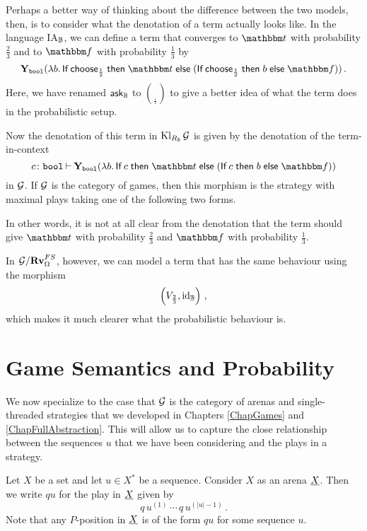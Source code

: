 Perhaps a better way of thinking about the difference between the two models, then, is to consider what the denotation of a term actually looks like.  
In the language IA${}_{\mathbb{B}}$, we can define a term that converges to $\true$ with probability $\frac23$ and to $\false$ with probability $\frac13$ by
\[
  \Y_\bool(\lambda b.\If \choose_{\frac12} \Then \true \Else (\If \choose_{\frac12} \Then b \Else \false))\,.
  \]
Here, we have renamed $\operatorname{{\mathsf{ask}}}_{\mathbb{B}}$ to $\choose_{\frac12}$ to give a better idea of what the term does in the probabilistic setup.

Now the denotation of this term in $\operatorname{Kl}_{R_{\mathbb{B}}}\mathcal G$ is given by the denotation of the term-in-context
\[
  c\from\bool\ts\Y_{\bool}(\lambda b.\If c \Then \true \Else (\If c \Then b \Else \false))
  \]
in $\mathcal G$.
If $\mathcal G$ is the category of games, then this morphism is the strategy with maximal plays taking one of the following two forms.
In other words, it is not at all clear from the denotation that the term should give $\true$ with probability $\frac23$ and $\false$ with probability $\frac13$.

In $\mathcal G/{\normalfont\textbf{Rv}}_{\Omega}^{FS}$, however, we can model a term that has the same behaviour using the morphism
\[
  \left(V_{\frac23}, \operatorname{id}_{\mathbb{B}}\right)\,,
  \]
which makes it much clearer what the probabilistic behaviour is.

\section{Game Semantics and Probability}

We now specialize to the case that $\mathcal G$ is the category of arenas and single-threaded strategies that we developed in Chapters \ref{ChapGames} and \ref{ChapFullAbstraction}.
This will allow us to capture the close relationship between the sequences $u$ that we have been considering and the plays in a strategy.

\begin{definition}
  Let $X$ be a set and let $u\in X^*$ be a sequence.  
  Consider $X$ as an arena ${\underline{X}}$.  
  Then we write $qu$ for the play in ${\underline{X}}$ given by
  \[
    q\,u^{(1)}\,\cdots\,q\,u^{(|u|-1)}\,.
    \]
  Note that any $P$-position in ${\underline{X}}$ is of the form $qu$ for some sequence $u$.  
\end{definition}

